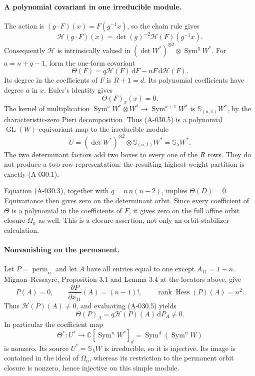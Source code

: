 \paragraph{A polynomial covariant in one irreducible module.}
The action is \((g\cdot F)(x)=F(g^{-1}x)\), so the chain rule gives
\[
 \mathcal H(g\cdot F)(x)
       =\det(g)^{-2}\mathcal H(F)(g^{-1}x).             \tag{A-030.4}
\]
Consequently \(\mathcal H\) is intrinsically valued in
\((\det W^*)^{\otimes2}\otimes\operatorname{Sym}^{q}W^*\).
For \(a=n+q-1\), form the one-form covariant
\[
 \Theta(F)=q\mathcal H(F)\,\mathrm dF
                         -nF\,\mathrm d\mathcal H(F).          \tag{A-030.5}
\]
Its degree in the coefficients of \(F\) is \(R+1=d\).
Its polynomial coefficients have degree \(a\) in \(x\).
Euler's identity gives
\[
                       \Theta(F)_x(x)=0.                      \tag{A-030.6}
\]
The kernel of multiplication
\(\operatorname{Sym}^aW^*\otimes W^*
\longrightarrow\operatorname{Sym}^{a+1}W^*\)
is \(\mathbb S_{(a,1)}W^*\), by the characteristic-zero
Pieri decomposition. Thus (A-030.5) is a polynomial
\(\operatorname{GL}(W)\)-equivariant map to the irreducible module
\[
 U=(\det W^*)^{\otimes2}\otimes\mathbb S_{(a,1)}W^*
                 =\mathbb S_\lambda W^*.                       \tag{A-030.7}
\]
The two determinant factors add two boxes to every one of the
\(R\) rows. They do not produce a two-row representation:
the resulting highest-weight partition is exactly (A-030.1).

Equation (A-030.3), together with \(q=n\,n(n-2)\), implies
\(\Theta(D)=0\). Equivariance then gives zero on the determinant
orbit. Since every coefficient of \(\Theta\) is a polynomial
in the coefficients of \(F\), it gives zero on the full affine
orbit closure \(\Omega_n\) as well. This is a closure assertion,
not only an orbit-stabilizer calculation.

\paragraph{Nonvanishing on the permanent.}
Let \(P=\operatorname{perm}_n\) and let \(A\) have all entries
equal to one except \(A_{11}=1-n\). Mignon--Ressayre,
Proposition 3.1 and Lemma 3.4 at the locators above, give
\[
 P(A)=0,\qquad
 \frac{\partial P}{\partial x_{11}}(A)=(n-1)!,\qquad
 \operatorname{rank}\operatorname{Hess}(P)(A)=n^2.               \tag{A-030.8}
\]
Thus \(\mathcal H(P)(A)\ne0\), and evaluating (A-030.5) yields
\[
 \Theta(P)_A=q\mathcal H(P)(A)\,\mathrm dP_A\ne0.                \tag{A-030.9}
\]
In particular the coefficient map
\[
 \Theta^*:U^*\longrightarrow
       \mathbb C[\operatorname{Sym}^nW^*]_d
       =\operatorname{Sym}^{d}(\operatorname{Sym}^nW)            \tag{A-030.10}
\]
is nonzero. Its source \(U^*=\mathbb S_\lambda W\) is
irreducible, so it is injective. Its image is contained in the
ideal of \(\Omega_n\), whereas its restriction to the permanent
orbit closure is nonzero, hence injective on this simple module.

